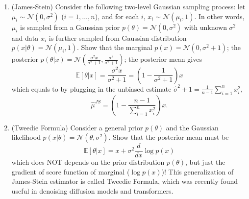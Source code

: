 \documentclass[11pt]{article}
\def\E{{\mathbb E}}
\begin{document}
\begin{enumerate}
\begin{enumerate}
\item (James-Stein) Consider the following two-level Gaussian sampling process: let $\mu_i \sim \mathcal{N}(0,\sigma^2)$ ($i=1,\ldots, n$), and for each $i$, $x_i\sim \mathcal{N}(\mu_i,1)$. In other words, $\mu_i$ is sampled from a Gaussian prior $ p(\theta) = \mathcal{N}(0,\sigma^2)$ with unknown $\sigma^2$ and data $x_i$ is further sampled from Gaussian distribution $p(x|\theta)=\mathcal{N}(\mu_i,1)$. Show that 
\subitem[i.] the marginal $p(x) = \mathcal{N}(0, \sigma^2+1)$; 
\subitem[ii.] the posterior $p(\theta | x) = \mathcal{N}\left( \frac{\sigma^2 x}{\sigma^2+1}, \frac{\sigma^2}{\sigma^2+1} \right)$;
\subitem[iii.] the posterior mean gives
\[  \E[\theta | x] = \frac{\sigma^2 x}{\sigma^2+1} = \left( 1 - \frac{1}{\sigma^2+1} \right) x
\] 
which equals to by plugging in the unbiased estimate $\widehat{\sigma}^2 + 1 = \frac{1}{n-1} \sum_{i=1}^n x_i^2$,
\[  \widehat{\mu}^{JS} =  \left( 1 - \frac{n-1 }{\sum_{i=1}^n x_i^2} \right) x .
\] 
\item (Tweedie Formula) Consider a general prior $p(\theta)$ and the Gaussian likelihood $p(x|\theta) = \mathcal{N}(\theta,\sigma^2)$. Show that the posterior mean must be
\begin{equation} 
\E[\theta | x] = x + \sigma^2 \frac{d}{dx} \log p(x) 
\end{equation} 
which does NOT depends on the prior distribution $p(\theta)$, but just the gradient of score function of marginal ($\log p(x)$)!  This generalization of James-Stein estimator is called Tweedie Formula, which was recently found useful in denoising diffusion models and transformers.
\end{enumerate}


\end{enumerate}
\end{document}
